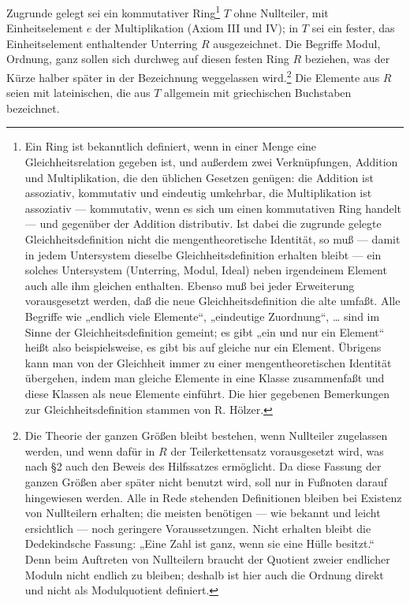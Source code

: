 \documentclass[11pt]{article}
\begin{document}
Zugrunde gelegt sei ein kommutativer Ring\footnote{Ein Ring ist bekanntlich
definiert, wenn in einer Menge eine Gleichheitsrelation gegeben ist, und außerdem
zwei Verknüpfungen, Addition und Multiplikation, die den üblichen Gesetzen genügen:
die Addition ist assoziativ, kommutativ und eindeutig umkehrbar, die Multiplikation
ist assoziativ — kommutativ, wenn es sich um einen kommutativen Ring handelt —
und gegenüber der Addition distributiv. Ist dabei die zugrunde gelegte
Gleichheitsdefinition nicht die mengentheoretische Identität, so muß — damit in
jedem Untersystem dieselbe Gleichheitsdefinition erhalten bleibt — ein solches
Untersystem (Unterring, Modul, Ideal) neben irgendeinem Element auch alle ihm
gleichen enthalten. Ebenso muß bei jeder Erweiterung vorausgesetzt werden, daß
die neue Gleichheitsdefinition die alte umfaßt. Alle Begriffe wie „endlich viele
Elemente“, „eindeutige Zuordnung“, \dots{} sind im Sinne der Gleichheitsdefinition
gemeint; es gibt „ein und nur ein Element“ heißt also beispielsweise, es gibt bis
auf gleiche nur ein Element. Übrigens kann man von der Gleichheit immer zu einer
mengentheoretischen Identität übergehen, indem man gleiche Elemente in eine Klasse
zusammenfaßt und diese Klassen als neue Elemente einführt. Die hier gegebenen
Bemerkungen zur Gleichheitsdefinition stammen von R. Hölzer.} $T$ ohne Nullteiler,
mit Einheitselement $e$ der Multiplikation (Axiom III und IV); in $T$ sei ein
fester, das Einheitselement enthaltender Unterring $R$ ausgezeichnet. Die Begriffe
Modul, Ordnung, ganz sollen sich durchweg auf diesen festen Ring $R$ beziehen,
was der Kürze halber später in der Bezeichnung weggelassen wird.\footnote{Die
Theorie der ganzen Größen bleibt bestehen, wenn Nullteiler zugelassen werden, und
wenn dafür in $R$ der Teilerkettensatz vorausgesetzt wird, was nach §2 auch den
Beweis des Hilfssatzes ermöglicht. Da diese Fassung der ganzen Größen aber später
nicht benutzt wird, soll nur in Fußnoten darauf hingewiesen werden. Alle in Rede
stehenden Definitionen bleiben bei Existenz von Nullteilern erhalten; die meisten
benötigen — wie bekannt und leicht ersichtlich — noch geringere Voraussetzungen.
Nicht erhalten bleibt die Dedekindsche Fassung: „Eine Zahl ist ganz, wenn sie eine
Hülle besitzt.“ Denn beim Auftreten von Nullteilern braucht der Quotient zweier
endlicher Moduln nicht endlich zu bleiben; deshalb ist hier auch die Ordnung direkt
und nicht als Modulquotient definiert.} Die Elemente aus $R$ seien mit lateinischen,
die aus $T$ allgemein mit griechischen Buchstaben bezeichnet.
\end{document}
